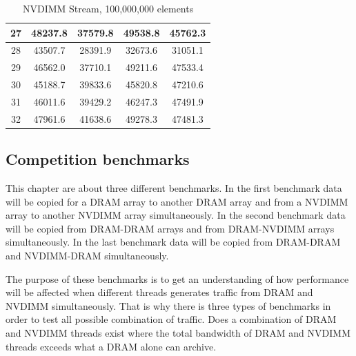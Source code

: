 \documentclass[12pt,a4paper,USenglish]{article}      %
\begin{document}
\begin{table}[!hbtp]
\begin{tabular}{ |c|c|c|c|c| }
\hline
27 & 48237.8 & 37579.8 & 49538.8 & 45762.3 \\
\hline
28 & 43507.7 & 28391.9 & 32673.6 & 31051.1 \\
\hline
29 & 46562.0 & 37710.1 & 49211.6 & 47533.4 \\
\hline
30 & 45188.7 & 39833.6 & 45820.8 & 47210.6 \\
\hline
31 & 46011.6 & 39429.2 & 46247.3 & 47491.9 \\
\hline
32 & 47961.6 & 41638.6 & 49278.3 & 47481.3 \\
\hline
\end{tabular}
\caption{NVDIMM Stream, 100,000,000 elements}
\label{tab:NVM_STREAM_100M_Table}
\end{table}

\subsection{Competition benchmarks}
This chapter are about three different benchmarks. In the first benchmark data will be copied for a DRAM array to another DRAM array and from a NVDIMM array to another NVDIMM array simultaneously. In the second benchmark data will be copied from DRAM-DRAM arrays and from DRAM-NVDIMM arrays simultaneously. In the last benchmark data will be copied from DRAM-DRAM and NVDIMM-DRAM simultaneously.

The purpose of these benchmarks is to get an understanding of how performance will be affected when different threads generates traffic from DRAM and NVDIMM simultaneously. That is why there is three types of benchmarks in order to test all possible combination of traffic. Does a combination of DRAM and NVDIMM threads exist where the total bandwidth of DRAM and NVDIMM threads exceeds what a DRAM alone can archive. 
\end{document}
